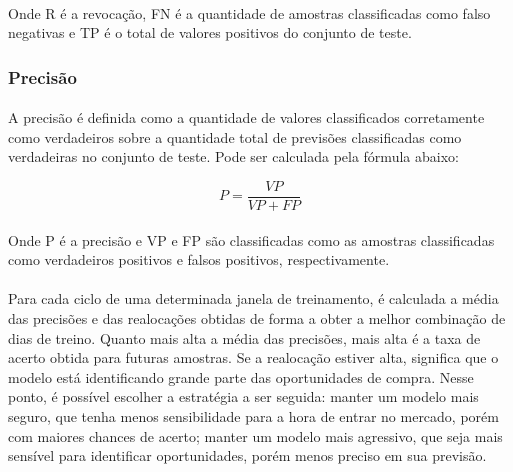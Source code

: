 \documentclass[grad,numbers]{coppe}
\begin{document}
                    \paragraph{}Onde R é a revocação, FN é a quantidade de amostras classificadas como falso negativas e TP é o total de valores positivos do conjunto de teste.
                    
                \subsubsection{Precisão}
                    \paragraph{}A precisão é definida como a quantidade de valores classificados corretamente como verdadeiros sobre a quantidade total de previsões classificadas como verdadeiras no conjunto de teste. Pode ser calculada pela fórmula abaixo:
                    
                    \begin{equation}
                        P = \frac{VP}{VP + FP}
                    \end{equation}
                    
                    \paragraph{}Onde P é a precisão e VP e FP são classificadas como as amostras classificadas como verdadeiros positivos e falsos positivos, respectivamente.
                    
                \paragraph{}Para cada ciclo de uma determinada janela de treinamento, é calculada a média das precisões e das realocações obtidas de forma a obter a melhor combinação de dias de treino. Quanto mais alta a média das precisões, mais alta é a taxa de acerto obtida para futuras amostras. Se a realocação estiver alta, significa que o modelo está identificando grande parte das oportunidades de compra. Nesse ponto, é possível escolher a estratégia a ser seguida: manter um modelo mais seguro, que tenha menos sensibilidade para a hora de entrar no mercado, porém com maiores chances de acerto; manter um modelo mais agressivo, que seja mais sensível para identificar oportunidades, porém menos preciso em sua previsão.
                
\end{document}
